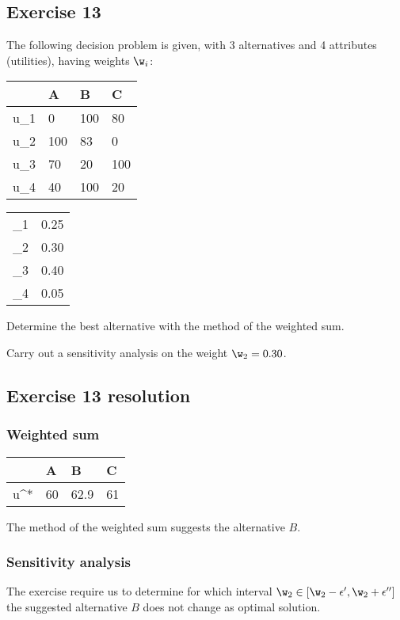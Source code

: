 \documentclass[\main/main.tex]{subfiles}
\begin{document}
\subsection{Exercise 13}
The following decision problem is given, with 3 alternatives and 4 attributes (utilities), having weights $\w_i$:

\begin{table}
  \begin{tabular}{L|LLL}
     & A   & B   & C   \\
    \hline
    u_1               & 0   & 100 & 80  \\
    u_2               & 100 & 83  & 0   \\
    u_3               & 70  & 20  & 100 \\
    u_4               & 40  & 100 & 20
  \end{tabular}
  \begin{tabular}{L|L}
         &  \\
    \hline
    \w_1 & 0.25           \\
    \w_2 & 0.30           \\
    \w_3 & 0.40           \\
    \w_4 & 0.05
  \end{tabular}
\end{table}

Determine the best alternative with the method of the weighted sum.

Carry out a sensitivity analysis on the weight $\w_2 = 0.30$.

\subsection{Exercise 13 resolution}
\subsubsection*{Weighted sum}
\begin{table}
  \begin{tabular}{L|LLL}
     & A  & B    & C  \\
    \hline
    u^*               & 60 & 62.9 & 61 \\
  \end{tabular}
\end{table}
The method of the weighted sum suggests the alternative $B$.

\subsubsection*{Sensitivity analysis}
The exercise require us to determine for which interval $\w_2 \in [\w_2 - \epsilon', \w_2 + \epsilon'']$ the suggested alternative $B$ does not change as optimal solution.
\end{document}
